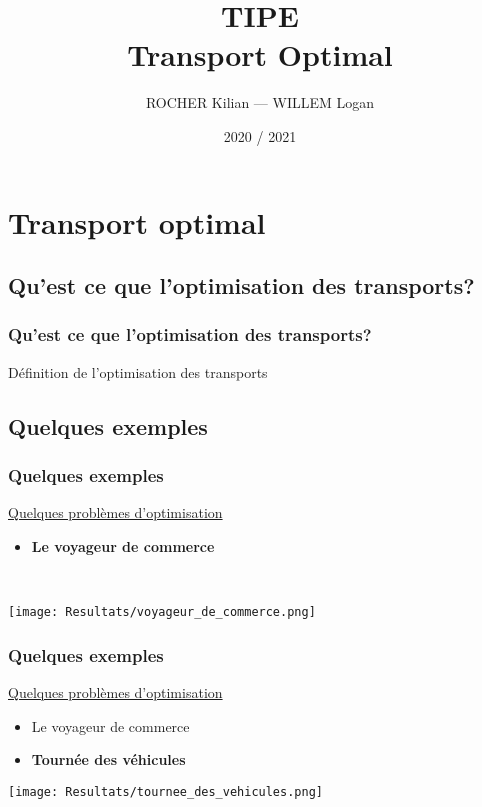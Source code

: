 \documentclass[10pt]{beamer}
\title[TIPE — Transport Optimal]{TIPE \\ Transport Optimal}
\author{ROCHER Kilian — WILLEM Logan}
\date{2020 / 2021}
\begin{document}
	\begin{frame}[plain]
		\maketitle
	\end{frame}

	\begin{frame}[plain]
		\tableofcontents
	\end{frame}

	\section{Transport optimal}
	
	\subsection{Qu'est ce que l'optimisation des transports?}
	
	\begin{frame}
		\frametitle{Qu'est ce que l'optimisation des transports?}
		Définition de l'optimisation des transports
	\end{frame}
	
	\subsection{Quelques exemples}
	
	\begin{frame}
		\frametitle{Quelques exemples}
		\underline{Quelques problèmes d'optimisation}
		\pause
		\begin{itemize}[label=—]
			\item \textbf{Le voyageur de commerce}
		\end{itemize}
		\ \\
		\begin{center}
			\texttt{[image: Resultats/voyageur\_de\_commerce.png]}
		\end{center}
	\end{frame}

	\begin{frame}
		\frametitle{Quelques exemples}
		\underline{Quelques problèmes d'optimisation}
		\begin{itemize}[label=—]
			\item Le voyageur de commerce
			\item \textbf{Tournée des véhicules}
		\end{itemize}
		\begin{center}
			\texttt{[image: Resultats/tournee\_des\_vehicules.png]}
		\end{center}
	\end{frame}
\end{document}
